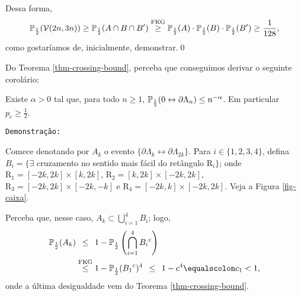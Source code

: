 \par Dessa forma, 
\begin{align*}
\operatorname{\mathbb{P}}_{\frac{1}{2}}(\operatorname{\mathcal{V}}(2n, 3n)) \geq \operatorname{\mathbb{P}}_{\frac{1}{2}}(A \cap B \cap B^{\prime}) \overset{\text{\scriptsize{FKG}}}{\geq} \operatorname{\mathbb{P}}_{\frac{1}{2}}(A) \cdot \operatorname{\mathbb{P}}_{\frac{1}{2}}(B) \cdot \operatorname{\mathbb{P}}_{\frac{1}{2}}(B^{\prime}) \geq \frac{1}{128},
\end{align*}
como gostaríamos de, inicialmente, demonstrar.\hspace{\fill}\qed

\par Do Teorema \ref{thm-crossing-bound}, perceba que conseguimos derivar o seguinte corolário:

\begin{mycol} \label{pc-maior-meio}
	Existe $\alpha > 0$ tal que, para todo $n \geq 1$, $\operatorname{\mathbb{P}}_{\frac{1}{2}}(0 \leftrightarrow \partial \Lambda_n) \leq n^{-\alpha}$. Em particular $p_c \geq \frac{1}{2}$.
\end{mycol}

\par \texttt{Demonstração:}

\par Comece denotando por $A_k$ o evento $\{\partial\Lambda_k \leftrightarrow \partial\Lambda_{2k}\}$. Para $i \in \{1, 2, 3, 4\}$, defina $B_i = \{\exists$ cruzamento no sentido mais fácil do retângulo $\text{R}_i\}$; onde $\text{R}_1 = [-2k, 2k] \times [k, 2k]$, $\text{R}_2 = [k, 2k] \times [-2k, 2k]$, $\text{R}_3 = [-2k, 2k] \times [-2k, -k]$ e $\text{R}_4 = [-2k, k] \times [-2k, 2k]$. Veja a Figura \ref{fig-caixa}.
 
\begin{figure*}[!htbp]
	\centering
	
	\vspace{-12pt}
	\caption{Caixas $\Lambda_k$ e $\Lambda_{2k}$ (linha sólida) com ocorrência do evento $A_k$ e caixas $\text{R}_i$, com $i \in \{1, \cdots, 4\}$ (linha tracejada).}
	\label{fig-caixa}
\end{figure*}

\par Perceba que, nesse caso, $A_k \subset \bigcup_{i = 1}^4 B_i$; logo,
\begin{align*}
\PX_{\frac{1}{2}}(A_k) &\overset{\phantom{\text{FKG}}}{\leq} 1 - \PX_{\frac{1}{2}}\left(\bigcap_{i = 1}^4{B_i}^c\right) \\
&\overset{\text{FKG}}{\leq} 1 - \PX_{\frac{1}{2}}({B_1}^c)^4 \overset{\phantom{\text{FKG}}}{\leq} 1 - c^4 \equalscolon c_1 < 1,
\end{align*}
onde a última desigualdade vem do Teorema \ref{thm-crossing-bound}. 


